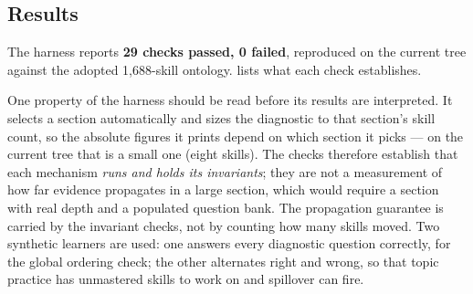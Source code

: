 \subsection{Results}

The harness reports \textbf{29 checks passed, 0 failed}, reproduced on the
current tree against the adopted 1{,}688-skill ontology.  lists
what each check establishes.

One property of the harness should be read before its results are interpreted.
It selects a section automatically and sizes the diagnostic to that section's
skill count, so the absolute figures it prints depend on which section it picks
--- on the current tree that is a small one (eight skills). The checks therefore
establish that each mechanism \emph{runs and holds its invariants}; they are not
a measurement of how far evidence propagates in a large section, which would
require a section with real depth and a populated question bank. The propagation
guarantee is carried by the invariant checks, not by counting how many skills
moved. Two synthetic learners are used: one answers every diagnostic question
correctly, for the global ordering check; the other alternates right and wrong,
so that topic practice has unmastered skills to work on and spillover can fire.

